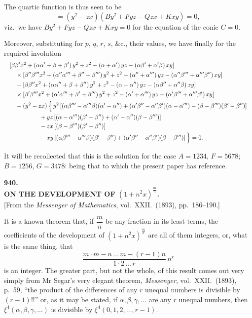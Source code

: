 \documentclass[11pt]{article}
\begin{document}
The quartic function is thus seen to be
\[ = (y^2 - zx)(By^2 + Fyz - Qzx + Kxy) = 0, \]
viz.\ we have $By^2 + Fyz - Qzx + Kxy = 0$ for the equation of the conic $C=0$.

Moreover, substituting for $p$, $q$, $r$, $s$, \&c., their values, we have finally for the required involution
\[ \resizebox{\textwidth}{!}{$\displaystyle
\begin{aligned}
&[\beta\beta' x^2 + (\alpha\alpha' + \beta + \beta')\,y^2 + z^2 - (\alpha + \alpha')\,yz - (\alpha\beta' + \alpha'\beta)\,xy]\\
&\quad\times [\beta''\beta''' x^2 + (\alpha''\alpha''' + \beta'' + \beta''')\,y^2 + z^2 - (\alpha'' + \alpha''')\,yz - (\alpha''\beta''' + \alpha'''\beta'')\,xy]\\
&\quad - [\beta\beta'' x^2 + (\alpha\alpha'' + \beta + \beta'')\,y^2 + z^2 - (\alpha + \alpha'')\,yz - (\alpha\beta'' + \alpha''\beta)\,xy]\\
&\quad\times [\beta'\beta''' x^2 + (\alpha'\alpha''' + \beta' + \beta''')\,y^2 + z^2 - (\alpha' + \alpha''')\,yz - (\alpha'\beta''' + \alpha'''\beta')\,xy]\\
&\quad - (y^2 - zx)\,\Big\{\, y^2\,[(\alpha\beta''' - \alpha'''\beta)(\alpha' - \alpha'') + (\alpha'\beta'' - \alpha''\beta')(\alpha - \alpha''') - (\beta - \beta''')(\beta' - \beta'')]\\
&\qquad\qquad\quad + yz\,[(\alpha - \alpha''')(\beta' - \beta'') + (\alpha' - \alpha'')(\beta - \beta''')]\\
&\qquad\qquad\quad - zx\,[(\beta - \beta''')(\beta' - \beta'')]\\
&\qquad\qquad\quad - xy\,[(\alpha\beta''' - \alpha'''\beta)(\beta' - \beta'') + (\alpha'\beta'' - \alpha''\beta')(\beta - \beta''')]\,\Big\} = 0.
\end{aligned}$} \]

It will be recollected that this is the solution for the case $A=1234$, $F=5678$; $B=1256$, $G=3478$: being that to which the present paper has reference.

\bigskip
\begin{center}
\textbf{\large 940.}\\[4pt]
\textbf{ON THE DEVELOPMENT OF $(1+n^2x)^{\frac{m}{n}}$.}\\[6pt]
[From the \textit{Messenger of Mathematics}, vol.\ XXII.\ (1893), pp.\ 186--190.]
\end{center}

It is a known theorem that, if $\dfrac{m}{n}$ be any fraction in its least terms, the coefficients of the development of $(1+n^2x)^{\frac{m}{n}}$ are all of them integers, or, what is the same thing, that
\[ \frac{m\cdot m-n\,\ldots\,m-(r-1)n}{1\cdot 2\,\ldots\,r}\,n^r \]
is an integer. The greater part, but not the whole, of this result comes out very simply from Mr Segar's very elegant theorem, \textit{Messenger}, vol.\ XXII.\ (1893), p.\ 59, ``the product of the differences of any $r$ unequal numbers is divisible by $(r-1)!!$'' or, as it may be stated, if $\alpha,\beta,\gamma,\ldots$ are any $r$ unequal numbers, then $\xi^4(\alpha,\beta,\gamma,\ldots)$ is divisible by $\xi^4(0,1,2,\ldots,r-1)$.
\end{document}
